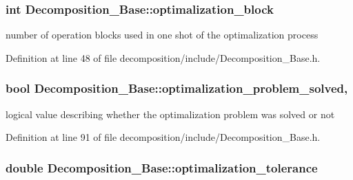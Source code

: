 \subsubsection[{\texorpdfstring{optimalization\+\_\+block}{optimalization_block}}]{\setlength{\rightskip}{0pt plus 5cm}int Decomposition\+\_\+\+Base\+::optimalization\+\_\+block\hspace{0.3cm}{\ttfamily [inherited]}}\hypertarget{class_decomposition___base_adae1205825aea9a9544d9ca42855b849}{}\label{class_decomposition___base_adae1205825aea9a9544d9ca42855b849}


number of operation blocks used in one shot of the optimalization process 



Definition at line 48 of file decomposition/include/\+Decomposition\+\_\+\+Base.\+h.

\subsubsection[{\texorpdfstring{optimalization\+\_\+problem\+\_\+solved}{optimalization_problem_solved}}]{\setlength{\rightskip}{0pt plus 5cm}bool Decomposition\+\_\+\+Base\+::optimalization\+\_\+problem\+\_\+solved\hspace{0.3cm}{\ttfamily [protected]}, {\ttfamily [inherited]}}\hypertarget{class_decomposition___base_ae9c42d3d9cdeeae765d6e7ebc2563d34}{}\label{class_decomposition___base_ae9c42d3d9cdeeae765d6e7ebc2563d34}


logical value describing whether the optimalization problem was solved or not 



Definition at line 91 of file decomposition/include/\+Decomposition\+\_\+\+Base.\+h.

\subsubsection[{\texorpdfstring{optimalization\+\_\+tolerance}{optimalization_tolerance}}]{\setlength{\rightskip}{0pt plus 5cm}double Decomposition\+\_\+\+Base\+::optimalization\+\_\+tolerance\hspace{0.3cm}{\ttfamily [inherited]}}\hypertarget{class_decomposition___base_ae08336b2cdfc58bbd03ba231716f28dd}{}\label{class_decomposition___base_ae08336b2cdfc58bbd03ba231716f28dd}


